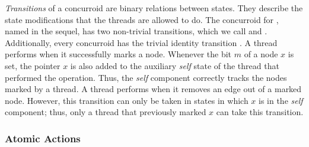 %
 
\emph{Transitions} of a concurroid are binary relations between
states. They describe the state modifications that the threads are allowed to do. 
The concurroid for , named  in the sequel, 
has two non-trivial transitions, which
we call  and . Additionally,
every concurroid has the trivial identity transition .
%
A thread performs  when it successfully marks a
node. Whenever the bit $m$ of a node $x$ is set, the pointer $x$ is
also added to the auxiliary \emph{self} state of the thread that
performed the operation. Thus, the \emph{self} component correctly
tracks the nodes marked by a thread.
%
A thread performs  when it removes an edge out of
a marked node. However, this transition can only be taken in states in
which $x$ is in the \emph{self} component; thus, only a thread that
previously marked $x$ can take this transition.




\subsubsection{Atomic Actions}
\label{sec:trans-resp-acti}

